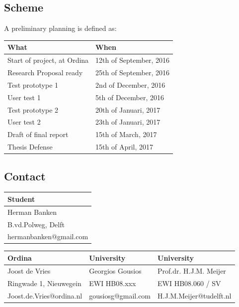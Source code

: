 \documentclass[11pt,a4paper]{article}
\begin{document}
\subsection{Scheme}
A preliminary planning is defined as:
\begin{table}[h]
\centering
\begin{tabular}{@{}ll@{}}
	\textbf{What} 						& \textbf{When} 	          \\\hline
	Start of project, at Ordina			& 12th of September, 2016 \\
	Research Proposal ready				& 25th of September, 2016 \\\hline
	Test prototype 1					& 2nd of December, 2016   \\
	User test 1							& 5th of December, 2016   \\\hline
	Test prototype 2					& 20th of Januari, 2017   \\
	User test 2							& 23th of Januari, 2017   \\\hline
	Draft of final report				& 15th of March, 2017     \\\hline
	Thesis Defense						& 15th of April, 2017     \\	
\end{tabular}	
\end{table}

\subsection{Contact}

\begin{table}[h]
\centering
\begin{tabular}{@{}l@{}}
\textbf{Student}       \\\hline
Herman Banken          \\
B.vd.Polweg, Delft 	   \\
hermanbanken@gmail.com \\
\end{tabular}				
\end{table}

\begin{table}[h]
\centering
\begin{tabular}{@{}lll@{}}
\textbf{Ordina}          & \textbf{University} & \textbf{University}      \\\hline
Joost de Vries           & Georgios Gousios    & Prof.dr. H.J.M. Meijer   \\
Ringwade 1, Nieuwegein   & EWI HB08.xxx        & EWI HB08.060 / SV        \\
Joost.de.Vries@ordina.nl & gousiosg@gmail.com  & H.J.M.Meijer@tudelft.nl  \\
\end{tabular}
\end{table}
\end{document}
